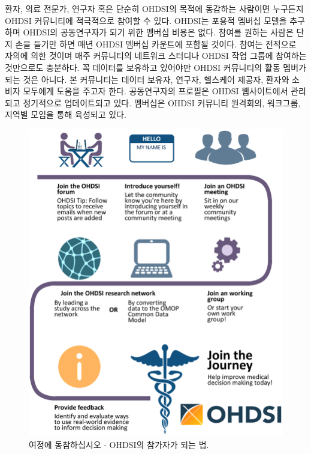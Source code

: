 \documentclass[10.5pt]{book}
\theoremstyle{definition}
\theoremstyle{definition}
\theoremstyle{definition}
\theoremstyle{remark}
\begin{document}
환자, 의료 전문가, 연구자 혹은 단순히 OHDSI의 목적에 동감하는 사람이면
누구든지 OHDSI 커뮤니티에 적극적으로 참여할 수 있다. OHDSI는 포용적
멤버십 모델을 추구하며 OHDSI의 공동연구자가 되기 위한 멤버십 비용은
없다. 참여를 원하는 사람은 단지 손을 들기만 하면 매년 OHDSI 멤버십
카운트에 포함될 것이다. 참여는 전적으로 자의에 의한 것이며 매주
커뮤니티의 네트워크 스터디나 OHDSI 작업 그룹에 참여하는 것만으로도
충분하다. 꼭 데이터를 보유하고 있어야만 OHDSI 커뮤니티의 활동 멤버가
되는 것은 아니다. 본 커뮤니티는 데이터 보유자, 연구자, 헬스케어 제공자,
환자와 소비자 모두에게 도움을 주고자 한다. 공동연구자의 프로필은 OHDSI
웹사이트에서 관리되고 정기적으로 업데이트되고 있다. 멤버십은 OHDSI
커뮤니티 원격회의, 워크그룹, 지역별 모임을 통해 육성되고 있다.
  

\begin{figure}

{\centering \includegraphics[width=0.9\linewidth]{images/WhereToBegin/joinTheJourney} 

}

\caption{여정에 동참하십시오 - OHDSI의 참가자가 되는 법.}\label{fig:jointhejourney}
\end{figure}
\end{document}
